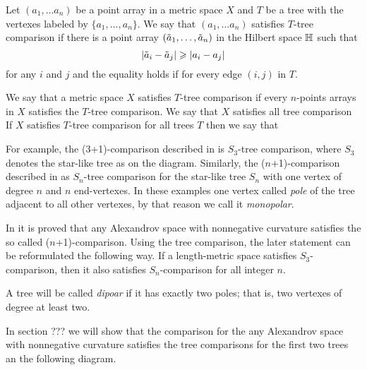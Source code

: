 Let $(a_1,\dots a_n)$ be a point array in a metric space $X$ and $T$ be a 
tree with the vertexes labeled by $\{a_1,\dots,a_n\}$.
We say that $(a_1,\dots a_n)$  satisfies $T$-tree comparison if there is a point array $(\~a_1,\dots, \~a_n)$ in the Hilbert space $\HH$ such that 
\[|\~a_i-\~a_j|\ge|a_i-a_j|\]
for any $i$ and $j$ and the equality holds if for every edge $(i,j)$ in $T$.

We say that a metric space $X$ satisfies $T$-tree comparison if 
every $n$-points arrays in $X$ satisfies the $T$-tree comparison.
We say that  $X$ satisfies all tree comparison
If $X$ satisfies $T$-tree comparison for all trees $T$ then we say that 

\begin{wrapfigure}{r}{20 mm}
\end{wrapfigure}

For example, the (3+1)-comparison described in \cite{AKP} is $S_3$-tree comparison, where $S_3$ denotes the star-like tree as on the diagram.
Similarly, the ($n$+1)-comparison described in \cite{AKP} as $S_n$-tree comparison for the star-like tree $S_n$ with one vertex of degree $n$ and $n$ end-vertexes.
In these examples one vertex called \emph{pole} of the tree adjacent to all other vertexes,
by that reason we call it \emph{monopolar}.

In \cite[4.1]{AKP} it is proved that any Alexandrov space with nonnegative curvature satisfies the so called  ($n$+1)-comparison.
Using the tree comparison, the later statement can be reformulated the following way.
If a length-metric space satisfies $S_3$-comparison, then it also satisfies $S_n$-comparison for all integer $n$.

A tree will be called \emph{dipoar} if it has exactly two poles;
that is, two vertexes of degree at least two.

In section ??? we will show that the comparison for the any Alexandrov space with nonnegative curvature satisfies the tree comparisons for the first two trees an the following diagram.


